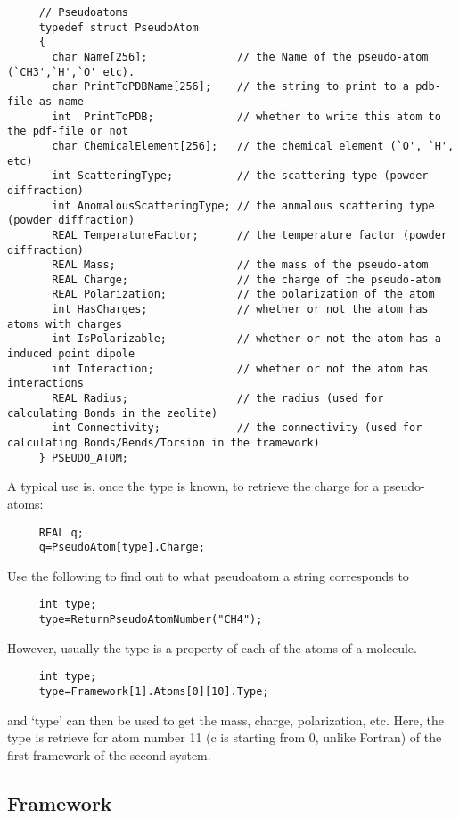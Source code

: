 \begin{footnotesize}
\begin{verbatim}
     // Pseudoatoms
     typedef struct PseudoAtom
     {
       char Name[256];              // the Name of the pseudo-atom (`CH3',`H',`O' etc).
       char PrintToPDBName[256];    // the string to print to a pdb-file as name
       int  PrintToPDB;             // whether to write this atom to the pdf-file or not
       char ChemicalElement[256];   // the chemical element (`O', `H', etc)
       int ScatteringType;          // the scattering type (powder diffraction)
       int AnomalousScatteringType; // the anmalous scattering type (powder diffraction)
       REAL TemperatureFactor;      // the temperature factor (powder diffraction)
       REAL Mass;                   // the mass of the pseudo-atom
       REAL Charge;                 // the charge of the pseudo-atom
       REAL Polarization;           // the polarization of the atom
       int HasCharges;              // whether or not the atom has atoms with charges 
       int IsPolarizable;           // whether or not the atom has a induced point dipole
       int Interaction;             // whether or not the atom has interactions
       REAL Radius;                 // the radius (used for calculating Bonds in the zeolite)
       int Connectivity;            // the connectivity (used for calculating Bonds/Bends/Torsion in the framework)
     } PSEUDO_ATOM;
\end{verbatim}
\end{footnotesize}

\noindent
A typical use is, once the type is known, to retrieve the charge for a pseudo-atoms:
\begin{verbatim}
     REAL q;
     q=PseudoAtom[type].Charge;
\end{verbatim}
Use the following to find out to what pseudoatom a string corresponds to
\begin{verbatim}
     int type;
     type=ReturnPseudoAtomNumber("CH4");
\end{verbatim}
However, usually the type is a property of each of the atoms of a molecule.
\begin{verbatim}
     int type;
     type=Framework[1].Atoms[0][10].Type;
\end{verbatim}
and `type' can then be used to get the mass, charge, polarization, etc. Here, the type is retrieve for atom number 11 (c is starting from 0, unlike Fortran)
of the first framework of the second system.

\subsection*{Framework}

